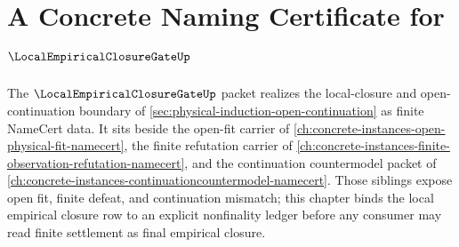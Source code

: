 \chapter{A Concrete Naming Certificate for $\LocalEmpiricalClosureGateUp$}
\label{ch:concrete-instances-local-empirical-closure-gate-namecert}

The $\LocalEmpiricalClosureGateUp$ packet realizes the local-closure and open-continuation boundary of \autoref{sec:physical-induction-open-continuation} as finite NameCert data. It sits beside the open-fit carrier of \autoref{ch:concrete-instances-open-physical-fit-namecert}, the finite refutation carrier of \autoref{ch:concrete-instances-finite-observation-refutation-namecert}, and the continuation countermodel packet of \autoref{ch:concrete-instances-continuationcountermodel-namecert}. Those siblings expose open fit, finite defeat, and continuation mismatch; this chapter binds the local empirical closure row to an explicit nonfinality ledger before any consumer may read finite settlement as final empirical closure.

